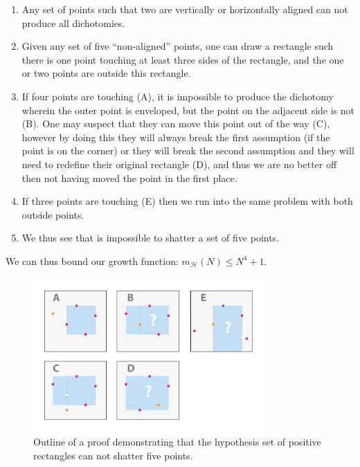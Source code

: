 \documentclass[11pt,letterpaper]{article}
\begin{document}
\begin{enumerate}
    \item Any set of points such that two are vertically or horizontally aligned can not produce all dichotomies.
    \item Given any set of five ``non-aligned'' points, one can draw a rectangle such there is one point touching at least three sides of the rectangle, and the one or two points are outside this rectangle.
    \item If four points are touching (A), it is impossible to produce the dichotomy wherein the outer point is enveloped, but the point on the adjacent side is not (B).  One may suspect that they can move this point out of the way (C), however by doing this they will always break the first assumption (if the point is on the corner) or they will break the second assumption and they will need to redefine their original rectangle (D), and thus we are no better off then not having moved the point in the first place.
    \item If three points are touching (E) then we run into the same problem with both outside points.
    \item We thus see that is impossible to shatter a set of five points.
\end{enumerate}

We can thus bound our growth function: $m_\mathcal{H}(N) \le N^4 + 1$.

\begin{figure}[]
    \centering
    \centering
    \includegraphics[width=0.8\textwidth]{problem_2_2_b.pdf}
    \caption{Outline of a proof demonstrating that the hypothesis set of positive rectangles can not shatter five points.}
    \label{fig:p2_2_2}
\end{figure}
\end{document}

